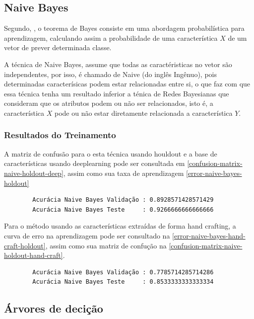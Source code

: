 \documentclass[
article,			%
11pt,				%
oneside,			%
a4paper,			%
english,			%
brazil,				%
sumario=tradicional,
]{abntex2}
\begin{document}
	\subsection{Naive Bayes}
	
	Segundo, , o teorema de Bayes consiste em uma abordagem probabilística para aprendizagem, calculando assim a probabilidade de uma característica \(X\) de um vetor de prever determinada classe.
	
	A técnica de Naive Bayes, assume que todas as caractéristicas no vetor são independentes, por isso, é chamado de Naive (do inglês Ingênuo), pois determinadas caracterísicas podem estar relacionadas entre si, o que faz com que essa técnica tenha um resultado inferior a ténica de Redes Bayesianas que consideram que os atributos podem ou não ser relacionados, isto é, a característica \(X\) pode ou não estar diretamente relacionada a característica \(Y\).
	
	\subsubsection{Resultados do Treinamento}
	
	A matriz de confusão para o esta técnica usando houldout e a base de características usando deeplearning pode ser consultada em \autoref{confusion-matrix-naive-holdout-deep}, assim como sua taxa de aprendizagem \autoref{error-naive-bayes-holdout}
	
	\begin{verbatim}
		Acurácia Naive Bayes Validação : 0.8928571428571429
		Acurácia Naive Bayes Teste     : 0.9266666666666666
	\end{verbatim}
	
	Para o método usando as características extraídas de forma hand crafting, a curva de erro na aprendizagem pode ser consultado na \autoref{error-naive-bayes-hand-craft-holdout}, assim como sua matriz de confução na \autoref{confusion-matrix-naive-holdout-hand-craft}.
	
	\begin{verbatim}
		Acurácia Naive Bayes Validação : 0.7785714285714286
		Acurácia Naive Bayes Teste     : 0.8533333333333334
	\end{verbatim}
	
	\subsection{Árvores de decição}
	
\end{document}
